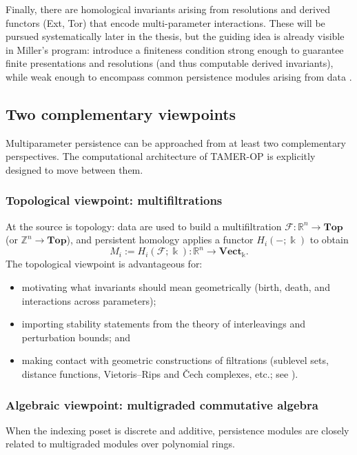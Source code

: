 \documentclass{article}
\newcommand{\kk}{\Bbbk}
\newcommand{\<}{\langle}
\renewcommand{\>}{\rangle}
\newcommand{\bbb}[1]{\ensuremath{\mathbb{#1}}}
\theoremstyle{definition}
\theoremstyle{remark}
\begin{document}
	Finally, there are homological invariants arising from resolutions and derived
	functors (Ext, Tor) that encode multi-parameter interactions.  These will be pursued
	systematically later in the thesis, but the guiding idea is already visible in
	Miller's program: introduce a finiteness condition strong enough to guarantee finite
	presentations and resolutions (and thus computable derived invariants), while weak
	enough to encompass common persistence modules arising from data \cite{Mil20}.
	
	\subsection{Two complementary viewpoints}\label{sec:background:viewpoints}
	
	Multiparameter persistence can be approached from at least two complementary
	perspectives.  The computational architecture of TAMER-OP is explicitly designed to
	move between them.
	
	\subsubsection*{Topological viewpoint: multifiltrations}
	
	At the source is topology: data are used to build a multifiltration
	$\mathcal{F}\colon \bbb{R}^n\to\mathbf{Top}$ (or $\bbb{Z}^n\to\mathbf{Top}$), and
	persistent homology applies a functor $H_i(-;\kk)$ to obtain
	\[
	M_i := H_i(\mathcal{F};\kk)\colon \bbb{R}^n\to \mathbf{Vect}_{\kk}.
	\]
	The topological viewpoint is advantageous for:
	\begin{itemize}
		\item motivating what invariants should mean geometrically (birth, death, and
		interactions across parameters);
		\item importing stability statements from the theory of interleavings and perturbation
		bounds; and
		\item making contact with geometric constructions of filtrations (sublevel sets, distance
		functions, Vietoris--Rips and \v{C}ech complexes, etc.; see \cite{EH10}).
	\end{itemize}
	
	\subsubsection*{Algebraic viewpoint: multigraded commutative algebra}
	
	When the indexing poset is discrete and additive, persistence modules are closely
	related to multigraded modules over polynomial rings.
	
\end{document}
